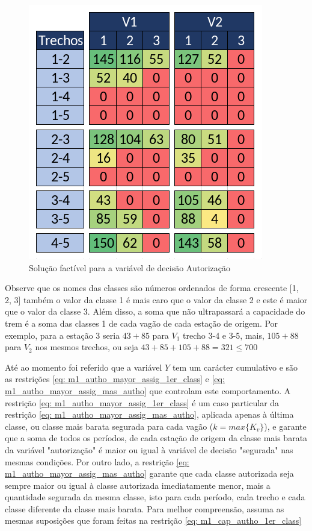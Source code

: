 \begin{figure}[!ht]
	\begin{center}
		\includegraphics[scale=0.40]{img/exemplo1.png}
		\caption{Solução factível para a variável de decisão Autorização}
		\label{fig: autorization}
	\end{center}
\end{figure}

Observe que os nomes das classes são números ordenados de forma crescente [1, 2, 3] também o valor da classe 1 é mais caro que o valor da classe 2 e este é maior que o valor da classe 3. Além disso, a soma que não ultrapassará a capacidade do trem é a soma das classes 1 de cada vagão de cada estação de origem. Por exemplo, para a estação 3 seria $43 + 85$ para $V_1$ trecho 3-4 e 3-5, mais, $105 + 88$ para $V_2$ nos mesmos trechos, ou seja $43 + 85 + 105 + 88 = 321 \leq 700$


Até ao momento foi referido que a variável $Y$ tem um carácter cumulativo e são as restrições \ref{eq: m1_autho_mayor_assig_1er_class} e \ref{eq: m1_autho_mayor_assig_mas_autho} que controlam este comportamento. A restrição \ref{eq: m1_autho_mayor_assig_1er_class} é um caso particular da restrição \ref{eq: m1_autho_mayor_assig_mas_autho}, aplicada apenas à última classe, ou classe mais barata segurada para cada vagão ($k=max\{K_v\}$), e garante que a soma de todos os períodos, de cada estação de origem da classe mais barata da variável "autorização" é maior ou igual à variável de decisão "segurada" nas mesmas condições. Por outro lado, a restrição \ref{eq: m1_autho_mayor_assig_mas_autho} garante que cada classe autorizada seja sempre maior ou igual à classe autorizada imediatamente menor, mais a quantidade segurada da mesma classe, isto para cada período, cada trecho e cada classe diferente da classe mais barata. Para melhor compreensão, assuma as mesmas suposições que foram feitas na restrição \ref{eq: m1_cap_autho_1er_class} %



